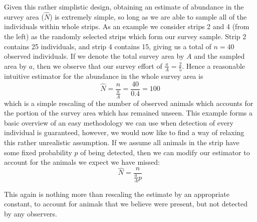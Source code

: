 \documentclass[11pt]{article}
\begin{document}
\begin{multicols}{2}
Given this rather simplistic design, obtaining an estimate of abundance in the survey area ($\hat{N}$) is extremely simple, so long as we are able to sample all of the individuals within whole strips. As an example we consider strips 2 and 4 (from the left) as the randomly selected strips which form our survey sample. Strip 2 contains 25 individuals, and strip 4 contains 15, giving us a total of $n=40$ observed individuals. If we denote the total survey area by $A$ and the sampled area by $a$, then we observe that our survey effort of $\frac{a}{A}=\frac{2}{5}$. Hence a reasonable intuitive estimator for the abundance in the whole survey area is
\begin{equation}
\hat{N}=\frac{n}{\frac{a}{A}}=\frac{40}{0.4}=100
\end{equation}
which is a simple rescaling of the number of observed animals which accounts for the portion of the survey area which has remained unseen. This example forms a basic overview of an easy methodology we can use when detection of every individual is guaranteed, however, we would now like to find a way of relaxing this rather unrealistic assumption. If we assume all animals in the strip have some fixed probability $p$ of being detected, then we can modify our estimator to account for the animals we expect we have missed:
\begin{equation}
\hat{N}=\frac{n}{\frac{a}{A}p}
\end{equation} 


This again is nothing more than rescaling the estimate by an appropriate constant, to account for animals that we believe were present, but not detected by any observers. 


\end{multicols}
\end{document}
